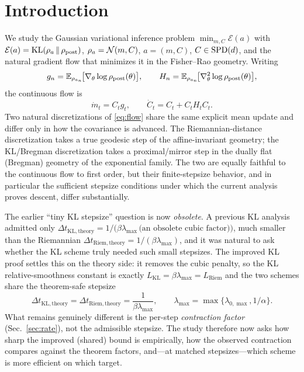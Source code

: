 \documentclass[11pt]{article}
\begin{document}
\section{Introduction}

We study the Gaussian variational inference problem
$\min_{m,C}\mathcal{E}(a)$ with $\mathcal{E}(a)=\mathrm{KL}(\rho_a\,\|\,\rho_{\mathrm{post}})$, $\rho_a=\mathcal{N}(m,C)$,
$a=(m,C)$, $C\in\mathrm{SPD}(d)$, and the natural gradient flow that minimizes it in the
Fisher--Rao geometry. Writing
\begin{equation}
g_n=\mathbb{E}_{\rho_{a_n}}\!\big[\nabla_\theta\log\rho_{\mathrm{post}}(\theta)\big],
\qquad
H_n=\mathbb{E}_{\rho_{a_n}}\!\big[\nabla^2_\theta\log\rho_{\mathrm{post}}(\theta)\big],
\end{equation}
the continuous flow is
\begin{equation}\label{eq:flow}
\dot m_t = C_t g_t,
\qquad
\dot C_t = C_t + C_t H_t C_t .
\end{equation}
Two natural discretizations of \eqref{eq:flow} share the same explicit mean
update and differ only in how the covariance is advanced. The Riemannian-distance
discretization takes a true geodesic step of the affine-invariant geometry; the
KL/Bregman discretization takes a proximal/mirror step in the dually flat
(Bregman) geometry of the exponential family. The two are equally faithful to the
continuous flow to first order, but their finite-stepsize behavior, and in
particular the sufficient stepsize conditions under which the current analysis
proves descent, differ substantially.

The earlier ``tiny KL stepsize'' question is now \emph{obsolete}. A previous KL
analysis admitted only
$\Delta t_{\mathrm{KL,theory}}=1/\big(\beta\lambda_{\max}\,\text{(an obsolete cubic factor)}\big)$,
much smaller than the Riemannian
$\Delta t_{\mathrm{Riem,theory}}=1/(\beta\lambda_{\max})$, and it was natural to
ask whether the KL scheme truly needed such small stepsizes. The improved KL proof
settles this on the theory side: it removes the cubic penalty, so the KL
relative-smoothness constant is exactly $L_{\mathrm{KL}}=\beta\lambda_{\max}=L_{\mathrm{Riem}}$
and the two schemes share the theorem-safe stepsize
\begin{equation}\label{eq:shared-dt}
\Delta t_{\mathrm{KL,theory}}=\Delta t_{\mathrm{Riem,theory}}=\frac1{\beta\lambda_{\max}},
\qquad
\lambda_{\max}=\max\{\lambda_{0,\max},1/\alpha\}.
\end{equation}
What remains genuinely different is the per-step \emph{contraction factor}
(Sec.~\ref{sec:rate}), not the admissible stepsize. The study therefore now asks
how sharp the improved (shared) bound is empirically, how the observed contraction
compares against the theorem factors, and---at matched stepsizes---which scheme is
more efficient on which target.
\end{document}
